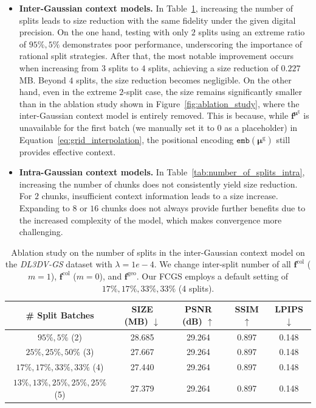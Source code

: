 \documentclass{article} %
\begin{document}
\begin{itemize}
    \item \textbf{Inter-Gaussian context models.}
    In Table~\ref{tab:number_of_splits_inter}, increasing the number of splits leads to size reduction with the same fidelity under the given digital precision. On the one hand, testing with only $2$ splits using an extreme ratio of $95\%, 5\%$ demonstrates poor performance, underscoring the importance of rational split strategies. After that, the most notable improvement occurs when increasing from $3$ splits to $4$ splits, achieving a size reduction of $0.227$ MB. Beyond $4$ splits, the size reduction becomes negligible. On the other hand, even in the extreme $2$-split case, the size remains significantly smaller than in the ablation study shown in Figure~\ref{fig:ablation_study}, where the inter-Gaussian context model is entirely removed. This is because, while $\bm{f}^{\bm{\mu}^\text{g}}$ is unavailable for the first batch (we manually set it to $0$ as a placeholder) in Equation~\ref{eq:grid_interpolation}, the positional encoding $\texttt{emb}(\bm{\mu}^\text{g})$ still provides effective context.
    \item \textbf{Intra-Gaussian context models.}
    In Table~\ref{tab:number_of_splits_intra}, increasing the number of chunks does not consistently yield size reduction. For $2$ chunks, insufficient context information leads to a size increase. Expanding to $8$ or $16$ chunks does not always provide further benefits due to the increased complexity of the model, which makes convergence more challenging.
\end{itemize}

\begin{table}[h]
    \centering
    \caption{Ablation study on the number of splits in the inter-Gaussian context model on the \textit{DL3DV-GS} dataset with $\lambda=1e-4$. We change inter-split number of all $\bm{f}^{\text{col}}$ ($m=1$), $\bm{f}^{\text{col}}$ ($m=0$), and $\bm{f}^{\text{geo}}$. Our FCGS employs a default setting of $17\%, 17\%, 33\%, 33\%$ (4 splits).}
    \vspace{5pt}
    \renewcommand{\arraystretch}{1.20}
    \setlength{\tabcolsep}{8pt}  
    \begin{tabular}{c|c|ccc}
        \toprule[2pt]
        \# Split Batches & SIZE (MB) $\downarrow$   & PSNR (dB) $\uparrow$ & SSIM $\uparrow$ & LPIPS $\downarrow$ \\  \bottomrule
        $95\%, 5\%$ (2) & 28.685 & 29.264 & 0.897 & 0.148     \\
        $25\%, 25\%, 50\%$ (3) & 27.667 & 29.264 & 0.897 & 0.148     \\
        $17\%, 17\%, 33\%, 33\%$ (4) & 27.440 & 29.264 & 0.897 & 0.148     \\
        $13\%, 13\%, 25\%, 25\%, 25\%$ (5) & 27.379 & 29.264 & 0.897 & 0.148     \\
        \bottomrule[2pt]
    \end{tabular}
    \label{tab:number_of_splits_inter}
\end{table}
\end{document}

